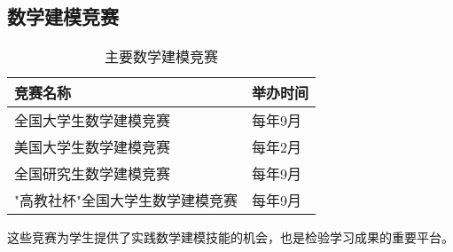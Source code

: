 \subsection{数学建模竞赛}

\begin{table}[htbp]
    \centering
    \caption{主要数学建模竞赛}
    \label{tab:modeling-competitions}
    \begin{tabular}{@{}ll@{}}
        \toprule
        竞赛名称 & 举办时间 \\
        \midrule
        全国大学生数学建模竞赛 & 每年9月 \\
        美国大学生数学建模竞赛 & 每年2月 \\
        全国研究生数学建模竞赛 & 每年9月 \\
        "高教社杯"全国大学生数学建模竞赛 & 每年9月 \\
                 \bottomrule
     \end{tabular}
 \end{table}
 
 这些竞赛为学生提供了实践数学建模技能的机会，也是检验学习成果的重要平台。 
